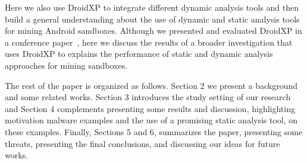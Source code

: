 Here we also use DroidXP to integrate different dynamic analysis tools and then build a
general understanding about the use of dynamic and static analysis tools for mining
Android sandboxes. Although we presented and evaluated DroidXP in a conference paper~\cite{DBLP:conf/scam/CostaMCMVBC20},
here we discuss the results of a broader investigation
that uses DroidXP to explains the performance of static and dynamic analysis
approaches for mining sandboxes.


The rest of the paper is organized as follows. Section 2 we present a background and some related works. Section 3 introduces the study setting of our research and Section 4 complements presenting some results and discussion, highlighting motivation malware examples and the use of a promising static analysis tool, on these examples. Finally, Sections 5 and 6, summarizes the paper, presenting some threats, presenting the final conclusions, and discussing our ideas for future works.



 
 
 
 
